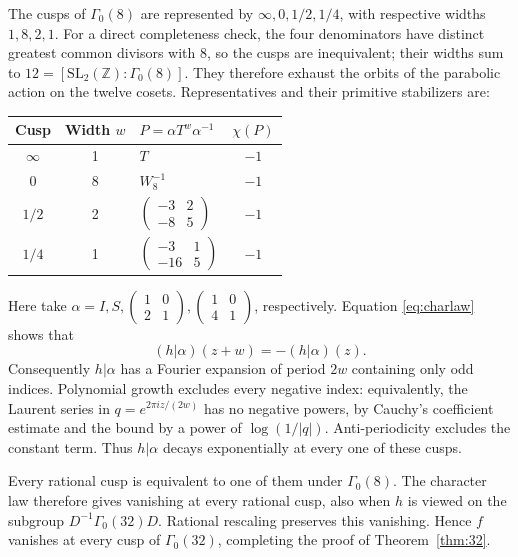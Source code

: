 \documentclass[11pt]{article}
\theoremstyle{remark}
\newcommand{\SL}{\mathrm{SL}}
\begin{document}
The cusps of $\Gamma_0(8)$ are represented by
$\infty,0,1/2,1/4$, with respective widths $1,8,2,1$.
For a direct completeness check, the four denominators have distinct
greatest common divisors with $8$, so the cusps are inequivalent;
their widths sum to $12=[\SL_2(\mathbb Z):\Gamma_0(8)]$.
They therefore exhaust the orbits of the parabolic action on the
twelve cosets. Representatives and their primitive stabilizers are:
\begin{center}
\renewcommand{\arraystretch}{1.7}
\begin{tabular}{@{}cclc@{}}
\toprule
Cusp & Width $w$ & $P=\alpha T^w\alpha^{-1}$ & $\chi(P)$\\
\midrule
$\infty$ & 1 & $T$ & $-1$\\
$0$ & 8 & $W_8^{-1}$ & $-1$\\
$1/2$ & 2 & $\begin{pmatrix}-3&2\\-8&5\end{pmatrix}$ & $-1$\\[3pt]
$1/4$ & 1 & $\begin{pmatrix}-3&1\\-16&5\end{pmatrix}$ & $-1$\\[3pt]
\bottomrule
\end{tabular}
\end{center}
Here take $\alpha=I,S,
\left(\begin{smallmatrix}1&0\\2&1\end{smallmatrix}\right),
\left(\begin{smallmatrix}1&0\\4&1\end{smallmatrix}\right)$,
respectively. Equation \eqref{eq:charlaw} shows that
\[
 (h|\alpha)(z+w)=-(h|\alpha)(z).
\]
Consequently $h|\alpha$ has a Fourier expansion of period $2w$
containing only odd indices. Polynomial growth excludes every negative
index: equivalently, the Laurent series in $q=e^{2\pi iz/(2w)}$
has no negative powers, by Cauchy's coefficient estimate and the
bound by a power of $\log(1/|q|)$. Anti-periodicity excludes the
constant term. Thus $h|\alpha$ decays exponentially at every one
of these cusps.

Every rational cusp is equivalent to one of them under $\Gamma_0(8)$.
The character law therefore gives vanishing at every rational cusp,
also when $h$ is viewed on the subgroup $D^{-1}\Gamma_0(32)D$.
Rational rescaling preserves this vanishing. Hence $f$ vanishes at
every cusp of $\Gamma_0(32)$, completing the proof of
Theorem~\ref{thm:32}.
\end{document}
